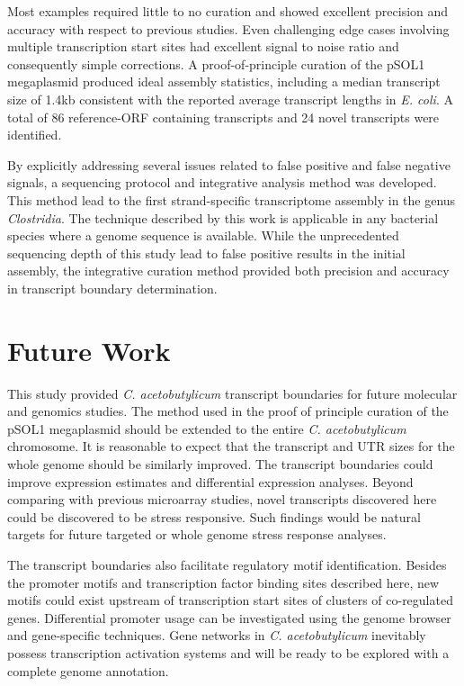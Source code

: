 Most examples required little to no curation and showed excellent precision and accuracy with respect to previous studies. Even challenging edge cases involving multiple transcription start sites had excellent signal to noise ratio and consequently simple corrections. A proof-of-principle curation of the pSOL1 megaplasmid produced ideal assembly statistics, including a median transcript size of 1.4kb consistent with the reported average transcript lengths in \textit{E. coli}. A total of 86 reference-ORF containing transcripts and 24 novel transcripts were identified.

By explicitly addressing several issues related to false positive and false negative signals, a sequencing protocol and integrative analysis method was developed. This method lead to the first strand-specific transcriptome assembly in the genus \textit{Clostridia}. The technique described by this work is applicable in any bacterial species where a genome sequence is available. While the unprecedented sequencing depth of this study lead to false positive results in the initial assembly, the integrative curation method provided both precision and accuracy in transcript boundary determination. 

\chapter{Future Work}
This study provided \textit{C. acetobutylicum} transcript boundaries for future molecular and genomics studies. The method used in the proof of principle curation of the pSOL1 megaplasmid should be extended to the entire \textit{C. acetobutylicum} chromosome. It is reasonable to expect that the transcript and UTR sizes for the whole genome should be similarly improved. The transcript boundaries could improve expression estimates and differential expression analyses. Beyond comparing with previous microarray studies, novel transcripts discovered here could be discovered to be stress responsive. Such findings would be natural targets for future targeted or whole genome stress response analyses. 

The transcript boundaries also facilitate regulatory motif identification. Besides the promoter motifs and transcription factor binding sites described here, new motifs could exist upstream of transcription start sites of clusters of co-regulated genes. Differential promoter usage can be investigated using the genome browser and gene-specific techniques. Gene networks in \textit{C. acetobutylicum} inevitably possess transcription activation systems and will be ready to be explored with a complete genome annotation.

